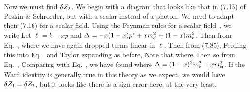 {	Now we must find $\delta Z_2$.  We begin with a diagram that looks like that in (7.15) of Peskin \& Schroeder, but with a scalar instead of a photon.  We need to adapt their (7.16) for a scalar field.  Using the Feynman rules for a scalar field~\cite[p.~118]{Peskin}, we write
	Let $\ell = k - x p$ and $\Delta = -x (1 - x) p^2 + x m_\phi^2 + (1 - x) m_e^2$.  Then from Eq.~,
	where we have again dropped terms linear in $\ell$.  Then from (7.85),
	Feeding this into Eq.~ and Taylor expanding as before,
	Note that
	where
	Then
	so from Eq.~,
	Comparing with Eq.~, we have found
	where $\Delta = (1 - x)^2 m_e^2 + x m_\phi^2$.  If the Ward identity is generally true in this theory as we expect, we would have $\delta Z_1 = \delta Z_2$, but it looks like there is a sign error here, at the very least.
}
